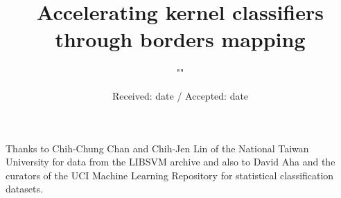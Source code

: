 \title{Accelerating kernel classifiers through borders mapping}


\author{""}



\date{Received: date / Accepted: date}


\maketitle

\begin{abstract}
	
\end{abstract}



\appendix



\begin{acknowledgements}
Thanks to Chih-Chung Chan and Chih-Jen Lin of the National Taiwan University
for data from the LIBSVM archive and also to David Aha and the curators of
the UCI Machine Learning Repository for statistical classification datasets.
\end{acknowledgements}




